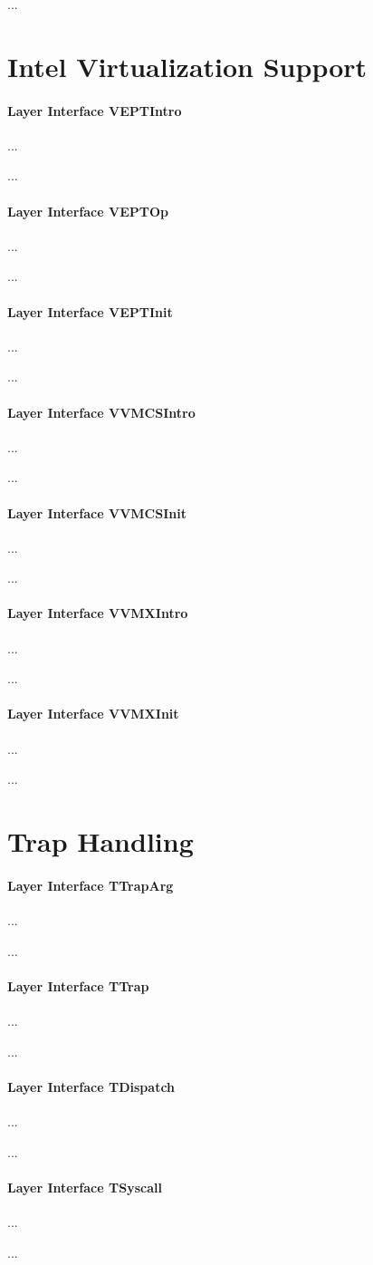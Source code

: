 ...

\section{Intel Virtualization Support}

\paragraph{Layer Interface VEPTIntro}
...

...

\paragraph{Layer Interface VEPTOp}
...

...

\paragraph{Layer Interface VEPTInit}
...

...

\paragraph{Layer Interface VVMCSIntro}
...

...

\paragraph{Layer Interface VVMCSInit}
...

...

\paragraph{Layer Interface VVMXIntro}
...

...

\paragraph{Layer Interface VVMXInit}
...

...

\section{Trap Handling}

\paragraph{Layer Interface TTrapArg}
...

...

\paragraph{Layer Interface TTrap}
...

...

\paragraph{Layer Interface TDispatch}
...

...

\paragraph{Layer Interface TSyscall}
...

...